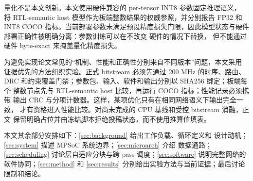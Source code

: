 量化不是本文创新。本文使用硬件兼容的 per-tensor INT8 参数固定推理语义，
将 RTL-semantic host 模型作为板端整数结果的权威参照，并分别报告 FP32 和
INT8 COCO 指标。当前部署参数未满足预设精度损失门限，因此模型状态与硬件
部署正确性被明确分离：参数训练可以在不改变 \LASA 硬件的情况下替换，
但不能通过硬件 byte-exact 来掩盖量化精度损失。

为避免实现论文常见的“机制、性能和正确性分别来自不同版本”问题，本文采用
证据优先的方法组织实验。正式 bitstream 必须先通过 200 MHz 的时序、路由、
DRC 和约束覆盖门禁；参数包、输入、软件和输出分别以 SHA256 绑定；板端每个
整数节点先与 RTL-semantic host 比较，再运行 COCO 指标；性能记录必须携带
输出 CRC 与分项计数器。这样，某项优化只有在相同网络语义下输出完全一致，
才有资格进入性能比较。对尚未完成的 CPU 基线和受控 bitstream 消融，正文
保留明确占位并由冻结脚本拒绝投稿状态，而不使用推算值填表。

本文其余部分安排如下：\cref{sec:background} 给出工作负载、循环定义和
设计动机；\cref{sec:system} 描述 MPSoC 系统边界；\cref{sec:microarch}
介绍 \LASA 数据通路；\cref{sec:scheduling} 讨论层自适应分块与跨 pass
调度；\cref{sec:software} 说明完整网络的软件协同；\cref{sec:method}
和 \cref{sec:results} 分别给出实验方法与当前证据；最后讨论限制和结论。
